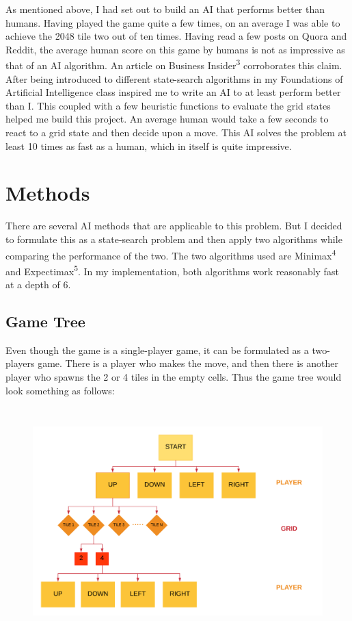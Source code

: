 \documentclass[english]{article}
\begin{document}
As mentioned above, I had set out to build an AI that performs better than humans. Having played the game quite a few times, on an average I was able to achieve the 2048 tile two out of ten times. Having read a few posts on Quora and Reddit, the average human score on this game by humans is not as impressive as that of an AI algorithm. An article on Business Insider\textsuperscript{3} corroborates this claim. After being introduced to different state-search algorithms in my Foundations of Artificial Intelligence class inspired me to write an AI to at least perform better than I. This coupled with a few heuristic functions to evaluate the grid states helped me build this project. An average human would take a few seconds to react to a grid state and then decide upon a move. This AI solves the problem at least 10 times as fast as a human, which in itself is quite impressive.
\section*{Methods}

There are several AI methods that are applicable to this problem. But I decided to formulate this as a state-search problem and then apply two algorithms while comparing the performance of the two. The two algorithms used are Minimax\textsuperscript{4} and Expectimax\textsuperscript{5}. In my implementation, both algorithms work reasonably fast at a depth of 6.

\subsection*{Game Tree}
Even though the game is a single-player game, it can be formulated as a two-players game. There is a player who makes the move, and then there is another player who spawns the 2 or 4 tiles in the empty cells. Thus the game tree would look something as follows:
\begin{figure}[H]
  \includegraphics[height=250pt]{Tree.png}
\end{figure}
\end{document}
